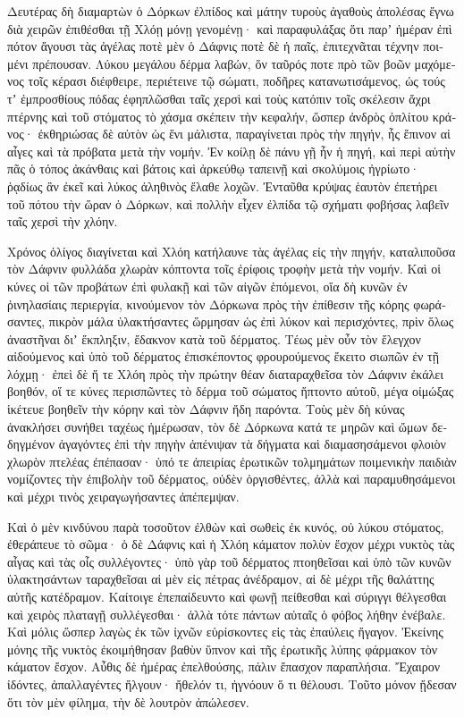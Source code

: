\documentclass{book}
\begin{document}
\begin{pairs}
\begin{Leftside}
\begin{greek}
  Δευτέρας δὴ διαμαρτὼν ὁ Δόρκων ἐλπίδος καὶ μάτην τυροὺς ἀγαθοὺς ἀπολέσας ἔγνω διὰ χειρῶν ἐπιθέσθαι τῇ Χλόῃ μόνῃ γενομένῃ· καὶ παραφυλάξας ὅτι παρʼ ἡμέραν ἐπὶ πότον ἄγουσι τὰς ἀγέλας ποτὲ μὲν ὁ Δάφνις ποτὲ δὲ ἡ παῖς, ἐπιτεχνᾶται τέχνην ποιμένι πρέπουσαν.  Λύκου μεγάλου δέρμα λαβών, ὅν ταῦρός ποτε πρὸ τῶν βοῶν μαχόμενος τοῖς κέρασι διέφθειρε, περιέτεινε τῷ σώματι, ποδῆρες κατανωτισάμενος, ὡς τούς τʼ ἐμπροσθίους πόδας ἐφηπλῶσθαι ταῖς χερσὶ καὶ τοὺς κατόπιν τοῖς σκέλεσιν ἄχρι πτέρνης καὶ τοῦ στόματος τὸ χάσμα σκέπειν τὴν κεφαλήν, ὥσπερ ἀνδρὸς ὁπλίτου κράνος·  ἐκθηριώσας δὲ αὑτὸν ὡς ἔνι μάλιστα, παραγίνεται πρὸς τὴν πηγήν, ἧς ἔπινον αἱ αἶγες καὶ τὰ πρόβατα μετὰ τὴν νομήν. Ἐν κοίλῃ δὲ πάνυ γῇ ἦν ἡ πηγή, καὶ περὶ αὐτὴν πᾶς ὁ τόπος ἀκάνθαις καὶ βάτοις καὶ ἀρκεύθῳ ταπεινῇ καὶ σκολύμοις ἠγρίωτο·  ῥᾳδίως ἂν ἐκεῖ καὶ λύκος ἀληθινὸς ἔλαθε λοχῶν. Ἐνταῦθα κρύψας ἑαυτὸν ἐπετήρει τοῦ πότου τὴν ὥραν ὁ Δόρκων, καὶ πολλὴν εἶχεν ἐλπίδα τῷ σχήματι φοβήσας λαβεῖν ταῖς χερσὶ τὴν χλόην.
\pend


  Χρόνος ὀλίγος διαγίνεται καὶ Χλόη κατήλαυνε τὰς ἀγέλας εἰς τὴν πηγήν, καταλιποῦσα τὸν Δάφνιν φυλλάδα χλωρὰν κόπτοντα τοῖς ἐρίφοις τροφὴν μετὰ τὴν νομήν.  Καὶ οἱ κύνες οἱ τῶν προβάτων ἐπὶ φυλακῇ καὶ τῶν αἰγῶν ἑπόμενοι, οἵα δὴ κυνῶν ἐν ῥινηλασίαις περιεργία, κινούμενον τὸν Δόρκωνα πρὸς τὴν ἐπίθεσιν τῆς κόρης φωράσαντες, πικρὸν μάλα ὑλακτήσαντες ὥρμησαν ὡς ἐπὶ λύκον καὶ περισχόντες, πρὶν ὅλως ἀναστῆναι διʼ ἔκπληξιν, ἔδακνον κατὰ τοῦ δέρματος.  Τέως μὲν οὖν τὸν ἔλεγχον αἰδούμενος καὶ ὑπὸ τοῦ δέρματος ἐπισκέποντος φρουρούμενος ἔκειτο σιωπῶν ἐν τῇ λόχμῃ· ἐπεὶ δὲ ἥ τε Χλόη πρὸς τὴν πρώτην θέαν διαταραχθεῖσα τὸν Δάφνιν ἐκάλει βοηθόν, οἵ τε κύνες περισπῶντες τὸ δέρμα τοῦ σώματος ἥπτοντο αὐτοῦ, μέγα οἰμώξας ἱκέτευε βοηθεῖν τὴν κόρην καὶ τὸν Δάφνιν ἤδη παρόντα.  Τοὺς μὲν δὴ κύνας ἀνακλήσει συνήθει ταχέως ἡμέρωσαν, τὸν δὲ Δόρκωνα κατά τε μηρῶν καὶ ὤμων δεδηγμένον ἀγαγόντες ἐπὶ τὴν πηγὴν ἀπένιψαν τὰ δήγματα καὶ διαμασησάμενοι φλοιὸν χλωρὸν πτελέας ἐπέπασαν·  ὑπό τε ἀπειρίας ἐρωτικῶν τολμημάτων ποιμενικὴν παιδιὰν νομίζοντες τὴν ἐπιβολὴν τοῦ δέρματος, οὐδὲν ὀργισθέντες, ἀλλὰ καὶ παραμυθησάμενοι καὶ μέχρι τινὸς χειραγωγήσαντες ἀπέπεμψαν.
\pend


  Καὶ ὁ μὲν κινδύνου παρὰ τοσοῦτον ἐλθὼν καὶ σωθεὶς ἐκ κυνός, οὐ λύκου στόματος, ἐθεράπευε τὸ σῶμα· ὁ δὲ Δάφνις καὶ ἡ Χλόη κάματον πολὺν ἔσχον μέχρι νυκτὸς τὰς αἶγας καὶ τὰς οἶς συλλέγοντες·  ὑπὸ γὰρ τοῦ δέρματος πτοηθεῖσαι καὶ ὑπὸ τῶν κυνῶν ὑλακτησάντων ταραχθεῖσαι αἱ μὲν εἰς πέτρας ἀνέδραμον, αἱ δὲ μέχρι τῆς θαλάττης αὐτῆς κατέδραμον. Καίτοιγε ἐπεπαίδευντο καὶ φωνῇ πείθεσθαι καὶ σύριγγι θέλγεσθαι καὶ χειρὸς πλαταγῇ συλλέγεσθαι·  ἀλλὰ τότε πάντων αὐταῖς ὁ φόβος λήθην ἐνέβαλε. Καὶ μόλις ὥσπερ λαγὼς ἐκ τῶν ἰχνῶν εὑρίσκοντες εἰς τὰς ἐπαύλεις ἤγαγον. Ἐκείνης μόνης τῆς νυκτὸς ἐκοιμήθησαν βαθὺν ὕπνον καὶ τῆς ἐρωτικῆς λύπης φάρμακον τὸν κάματον ἔσχον.  Αὖθις δὲ ἡμέρας ἐπελθούσης, πάλιν ἔπασχον παραπλήσια. Ἔχαιρον ἰδόντες, ἀπαλλαγέντες ἤλγουν· ἤθελόν τι, ἠγνόουν ὅ τι θέλουσι. Τοῦτο μόνον ᾔδεσαν ὅτι τὸν μὲν φίλημα, τὴν δὲ λουτρὸν ἀπώλεσεν.
\pend



\end{greek}
\end{Leftside}
\end{pairs}
\end{document}
